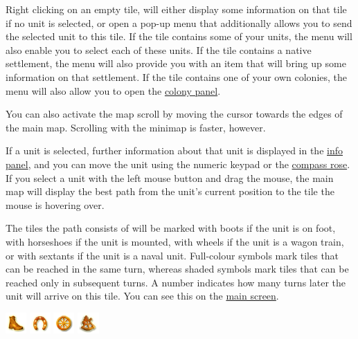 \documentclass[12pt]{article}
\begin{document}
Right clicking on an empty tile, will either display some information
on that tile if no unit is selected, or open a pop-up menu that
additionally allows you to send the selected unit to this tile. If the
tile contains some of your units, the menu will also enable you to
select each of these units. If the tile contains a native settlement,
the menu will also provide you with an item that will bring up some
information on that settlement. If the tile contains one of your own
colonies, the menu will also allow you to open the \hyperlink{colony
panel}{colony panel}.

You can also activate the map scroll by moving the cursor towards the
edges of the main map. Scrolling with the minimap is faster, however.

If a unit is selected, further information about that unit is
displayed in the \hyperlink{info panel}{info panel}, and you can move
the unit using the numeric keypad or the
\hyperlink{compass rose}{compass rose}. If you select a unit with the
left mouse button and drag the mouse, the main map will display the
best path from the unit's current position to the tile the mouse is
hovering over.

The tiles the path consists of will be marked with boots if the unit
is on foot, with horseshoes if the unit is mounted, with wheels if the
unit is a wagon train, or with sextants if the unit is a naval
unit. Full-colour symbols mark tiles that can be reached in the same
turn, whereas shaded symbols mark tiles that can be reached only in
subsequent turns. A number indicates how many turns later the unit
will arrive on this tile. You can see this on the \hyperlink{main
  screen}{main screen}.


  \begin{center}
    \includegraphics{images/path-foot.png}
    \includegraphics{images/path-horse.png}
    \includegraphics{images/path-wagon.png}
    \includegraphics{images/path-naval.png}
  \end{center}
\end{document}
